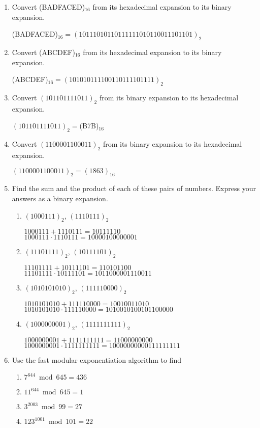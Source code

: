\documentclass[11pt]{article}
\begin{document}
\begin{enumerate}[label=\textbf{\arabic*.}]
	\item Convert (BADFACED)$_{16}$ from its hexadecimal expansion to its binary expansion.
	
	(BADFACED)$_{16} = (10111010110111111010110011101101)_2$
	
	\item Convert (ABCDEF)$_{16}$ from its hexadecimal expansion to its binary expansion.
	
	(ABCDEF)$_{16} = (101010111100110111101111)_2$
	
	\item Convert $(101101111011)_2$ from its binary expansion to its hexadecimal expansion.
	
	$(101101111011)_2 = $(B7B)$_{16}$
	
	\item Convert $(1100001100011)_2$ from its binary expansion to its hexadecimal expansion.
	
	$(1100001100011)_2 = (1863)_{16}$
	
	\item Find the sum and the product of each of these pairs of numbers. Express your answers as a binary expansion.
	
	\begin{enumerate}[label=\textbf{\alph*)}]
		\item $(1000111)_2$, $(1110111)_2$
		
		$1000111 + 1110111 = 10111110$ \\
		$1000111 \cdot 1110111 = 10000100000001$
		
		\item $(11101111)_2$, $(10111101)_2$
		
		$11101111 + 10111101 = 110101100$ \\
		$11101111 \cdot 10111101 = 1011000001110011$
		
		\item $(1010101010)_2$, $(111110000)_2$
		
		$1010101010 + 111110000 = 10010011010$ \\
		$1010101010 \cdot 111110000 = 1010010100101100000$
		
		\item $(1000000001)_2$, $(1111111111)_2$
		
		$1000000001 + 1111111111 = 11000000000$ \\
		$1000000001 \cdot 1111111111 = 10000000000111111111$
	\end{enumerate}

	\item Use the fast modular exponentiation algorithm to find
	
	\begin{enumerate}[label=\textbf{\alph*)}]
		\item $7^{644} \bmod 645 = 436$
		\item $11^{644} \bmod 645 = 1$
		\item $3^{2003} \bmod 99 = 27$
		\item $123^{1001} \bmod 101 = 22$
	\end{enumerate}
\end{enumerate}
\end{document}
